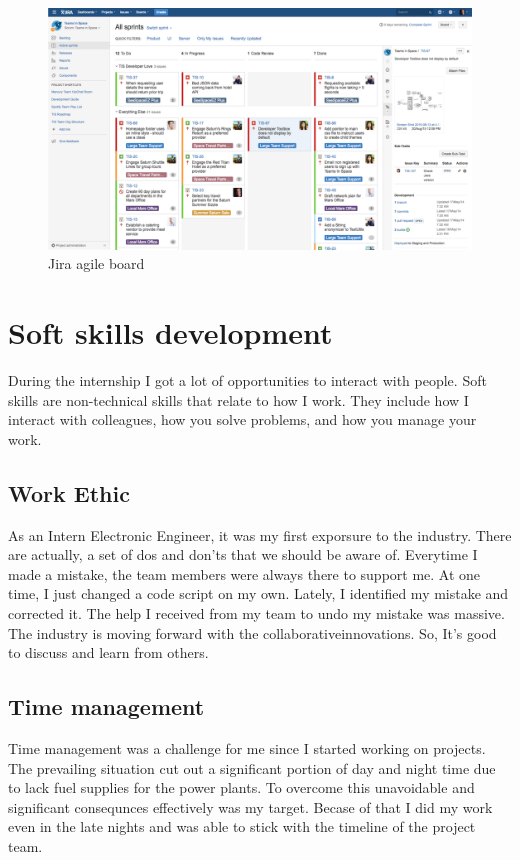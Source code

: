 \documentclass[twoside,12pt,times,onecolumn,a4paper]{report}
\begin{document}
\begin{figure}[H]
  \centering
   \includegraphics[width=15cm]{jira}
  \caption{Jira agile board}
\end{figure}


\chapter{Soft skills development}

During the internship I got a lot of opportunities to interact with people. Soft skills are non-technical skills that relate to how I work. They include how I interact with colleagues, how you solve problems, and how you manage your work.

\section{Work Ethic}
As an Intern Electronic Engineer, it was my first exporsure to the industry. There are actually, a set of dos and don'ts that we should be aware of. Everytime I made a mistake, the team members were always there to support me. At one time, I just changed a code script on my own. Lately, I identified my mistake and corrected it. The help I received from my team to undo my mistake was massive. The industry is moving forward with the collaborativeinnovations. So, It's good to discuss and learn from others.  

\section{Time management}
Time management was a challenge for me since I started working on projects. The prevailing situation cut out a significant portion of day and night time due to lack fuel supplies for the power plants. To overcome this unavoidable and significant consequnces effectively was my target. Becase of that I did my work even in the late nights and was able to stick with the timeline of the project team. 
\end{document}
